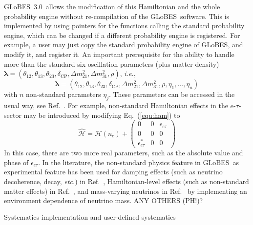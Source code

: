 \documentclass[12pt,a4paper]{article}
\makeatletter
\renewcommand{\section}{\@startsection{section}{1}{0em}{-\baselineskip}%
{\baselineskip}{\normalfont\large\bfseries}}
\newcommand{\ie}{{\it i.e.}}
\newcommand{\etc}{{\it etc.}}
\newcommand{\eq}{Eq.}
\newcommand{\Ref}{Ref.}
\newcommand{\ldm}{\Delta m_{31}^2}
\newcommand{\sdm}{\Delta m_{21}^2}
\newcommand{\deltacp}{\delta_{\mathrm{CP}}}
\newcommand{\GLOBES}{{\sf GLoBES}}
\newcommand{\GLOBESN}{{\sf GLoBES~3.0}}
\newcommand{\equ}[1]{\eq~(\ref{equ:#1})}
\makeatother
\begin{document}
\GLOBESN\ allows the modification of this Hamiltonian and the whole probability engine without
re-compilation of the \GLOBES\ software. This is implemented
by using pointers for the functions calling the standard probability engine, which can be changed if
a different probability engine is registered. For example, a user may just copy the standard probability
engine of \GLOBES , and modify it, and register it. An important prerequisite for the ability to handle
more than the standard six oscillation parameters (plus matter density) $\boldsymbol{\lambda}=(\theta_{12},\theta_{13}, \theta_{23}, \deltacp, \sdm, \ldm, \rho)$, \ie,
\begin{equation}
\boldsymbol{\lambda}=(\theta_{12},\theta_{13}, \theta_{23}, \deltacp, \sdm, \ldm, \rho, \eta_1, \hdots, \eta_n)
\end{equation}
with $n$ non-standard parameters $\eta_j$. These parameters can be accessed in the usual way, see \Ref~\cite{Manual}.
For example, non-standard Hamiltonian effects in the $e$-$\tau$-sector may be introduced by modifying \equ{ham} to
\begin{equation}
 \mathcal{\hat{H}} = \mathcal{H}(n_e) + 
\left(
\begin{array}{ccc}
0 & 0 & \epsilon_{e \tau} \\
0 & 0 & 0 \\
\epsilon_{e \tau}^* & 0 & 0 
\end{array}
\right)
\end{equation}
In this case, there are two more real parameters, such as the absolute value and phase of $\epsilon_{e \tau}$.
In the literature, the non-standard physics feature in \GLOBES\ as experimental feature has been used for damping effects (such as neutrino decoherence, decay, \etc) in \Ref~\cite{Blennow:2005yk}, Hamiltonian-level effects (such as non-standard matter effects) in \Ref~\cite{Blennow:2005qj}, and mass-varying neutrinos in \Ref~\cite{Schwetz:2005fy} by implementing an environment dependence of neutrino mass.  ANY OTHERS (PH!)?

\section{Systematics implementation and user-defined systematics}
\end{document}
